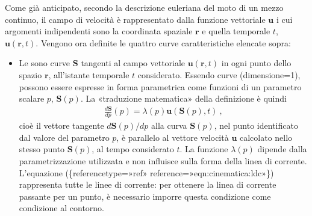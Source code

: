 \documentclass[letterpaper,10pt,italian]{jupyterBook}
\begin{document}
\sphinxAtStartPar
Come già anticipato, secondo la descrizione euleriana del moto di un
mezzo continuo, il campo di velocità è rappresentato dalla funzione
vettoriale \(\mathbf{u}\) i cui argomenti indipendenti sono la coordinata
spaziale \(\mathbf{r}\) e quella temporale \(t\), \(\mathbf{u}(\mathbf{r},t)\). Vengono
ora definite le quattro curve caratteristiche elencate sopra:
\begin{itemize}
\item {} 
\sphinxAtStartPar
Le  sono curve \(\mathbf{S}\) tangenti al campo
vettoriale \(\mathbf{u}(\mathbf{r},t)\) in ogni punto dello spazio \(\mathbf{r}\),
all’istante temporale \(t\) considerato. Essendo curve (dimensione=1),
possono essere espresse in forma parametrica come funzioni di un
parametro scalare \(p\), \(\mathbf{S}(p)\). La «traduzione matematica» della
definizione è quindi
\begin{equation*}
\begin{split}\label{eqn:cinematica:ldc}
     \frac{d\mathbf{S}}{dp}(p) = \lambda(p) \mathbf{u}(\mathbf{S}(p),t) \ ,\end{split}
\end{equation*}
\sphinxAtStartPar
cioè
il vettore tangente \({d\mathbf{S}(p)}/{dp}\) alla curva \(\mathbf{S}(p)\), nel
punto identificato dal valore del parametro \(p\), è parallelo al
vettore velocità \(\mathbf{u}\) calcolato nello stesso punto \(\mathbf{S}(p)\),
al tempo considerato \(t\). La funzione \(\lambda(p)\) dipende dalla
parametrizzazione utilizzata e non influisce sulla forma della linea
di corrente. L’equazione
(\{reference\sphinxhyphen{}type=»ref»
reference=»eqn:cinematica:ldc»\}) rappresenta tutte le linee di
corrente: per ottenere la linea di corrente passante per un punto, è
necessario imporre questa condizione come condizione al contorno.


\end{itemize}
\end{document}

